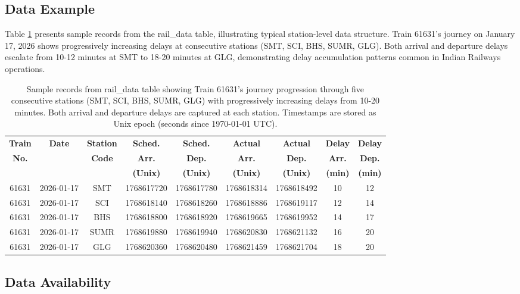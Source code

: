 \documentclass[11pt,a4paper]{article}
\begin{document}
\subsection{Data Example}

Table \ref{tab:data_example} presents sample records from the rail\_data table, illustrating typical station-level data structure. Train 61631's journey on January 17, 2026 shows progressively increasing delays at consecutive stations (SMT, SCI, BHS, SUMR, GLG). Both arrival and departure delays escalate from 10-12 minutes at SMT to 18-20 minutes at GLG, demonstrating delay accumulation patterns common in Indian Railways operations.

\begin{table}[h]
\centering
\small
\begin{tabular}{@{}ccccccccc@{}}
\toprule
\textbf{Train} & \textbf{Date} & \textbf{Station} & \textbf{Sched.} & \textbf{Sched.} & \textbf{Actual} & \textbf{Actual} & \textbf{Delay} & \textbf{Delay} \\
\textbf{No.} & & \textbf{Code} & \textbf{Arr.} & \textbf{Dep.} & \textbf{Arr.} & \textbf{Dep.} & \textbf{Arr.} & \textbf{Dep.} \\
& & & \textbf{(Unix)} & \textbf{(Unix)} & \textbf{(Unix)} & \textbf{(Unix)} & \textbf{(min)} & \textbf{(min)} \\
\midrule
61631 & 2026-01-17 & SMT & 1768617720 & 1768617780 & 1768618314 & 1768618492 & 10 & 12 \\
61631 & 2026-01-17 & SCI & 1768618140 & 1768618260 & 1768618886 & 1768619117 & 12 & 14 \\
61631 & 2026-01-17 & BHS & 1768618800 & 1768618920 & 1768619665 & 1768619952 & 14 & 17 \\
61631 & 2026-01-17 & SUMR & 1768619880 & 1768619940 & 1768620830 & 1768621132 & 16 & 20 \\
61631 & 2026-01-17 & GLG & 1768620360 & 1768620480 & 1768621459 & 1768621704 & 18 & 20 \\
\bottomrule
\end{tabular}
\caption{Sample records from rail\_data table showing Train 61631's journey progression through five consecutive stations (SMT, SCI, BHS, SUMR, GLG) with progressively increasing delays from 10-20 minutes. Both arrival and departure delays are captured at each station. Timestamps are stored as Unix epoch (seconds since 1970-01-01 UTC).}
\label{tab:data_example}
\end{table}

\subsection{Data Availability}
\end{document}
